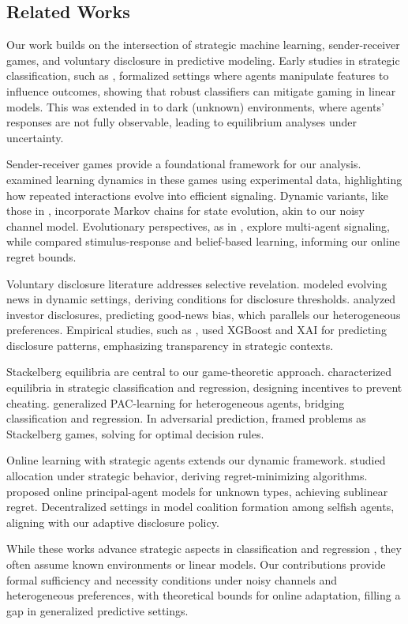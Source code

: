 \subsection{Related Works}

Our work builds on the intersection of strategic machine learning, sender-receiver games, and voluntary disclosure in predictive modeling. Early studies in strategic classification, such as \cite{hardt2016strategic}, formalized settings where agents manipulate features to influence outcomes, showing that robust classifiers can mitigate gaming in linear models. This was extended in \cite{ghalme2021strategic} to dark (unknown) environments, where agents' responses are not fully observable, leading to equilibrium analyses under uncertainty.

Sender-receiver games provide a foundational framework for our analysis. \cite{blume2002learning} examined learning dynamics in these games using experimental data, highlighting how repeated interactions evolve into efficient signaling. Dynamic variants, like those in \cite{renault2013dynamic}, incorporate Markov chains for state evolution, akin to our noisy channel model. Evolutionary perspectives, as in \cite{skyrms2009evolution}, explore multi-agent signaling, while \cite{blume1998learning} compared stimulus-response and belief-based learning, informing our online regret bounds.

Voluntary disclosure literature addresses selective revelation. \cite{aghamolla2019voluntary} modeled evolving news in dynamic settings, deriving conditions for disclosure thresholds. \cite{mcdonough2023voluntary} analyzed investor disclosures, predicting good-news bias, which parallels our heterogeneous preferences. Empirical studies, such as \cite{lu2024determinants}, used XGBoost and XAI for predicting disclosure patterns, emphasizing transparency in strategic contexts.

Stackelberg equilibria are central to our game-theoretic approach. \cite{jin2022incentive} characterized equilibria in strategic classification and regression, designing incentives to prevent cheating. \cite{sundaram2023pac} generalized PAC-learning for heterogeneous agents, bridging classification and regression. In adversarial prediction, \cite{bruckner2011stackelberg} framed problems as Stackelberg games, solving for optimal decision rules.

Online learning with strategic agents extends our dynamic framework. \cite{yin2022online} studied allocation under strategic behavior, deriving regret-minimizing algorithms. \cite{wu2025learning} proposed online principal-agent models for unknown types, achieving sublinear regret. Decentralized settings in \cite{cohen2025decentralized} model coalition formation among selfish agents, aligning with our adaptive disclosure policy.

While these works advance strategic aspects in classification \cite{trachtenberg2025strategic} and regression \cite{shavit2020causal}, they often assume known environments or linear models. Our contributions provide formal sufficiency and necessity conditions under noisy channels and heterogeneous preferences, with theoretical bounds for online adaptation, filling a gap in generalized predictive settings.
